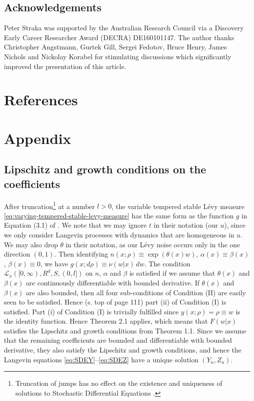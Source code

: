 \documentclass[a4paper,12pt]{elsarticle}
\numberwithin{equation}{section}
\theoremstyle{plain}
\theoremstyle{definition}
\theoremstyle{remark}
\numberwithin{equation}{section}
\newcommand{\1}{\mathbf 1}
\begin{document}
\subsection*{Acknowledgements}
Peter Straka was supported by the Australian Research Council via a 
Discovery Early Career Researcher Award (DECRA) DE160101147. 
The author thanks Christopher Angstmann, Gurtek Gill, 
Sergei Fedotov, Bruce Henry, James Nichols and Nickolay Korabel for stimulating discussions which 
significantly improved the presentation of this article. 

\section*{References}



\appendix

\section{Appendix}

\subsection{Lipschitz and growth conditions on the coefficients} 
\label{subsec:Lip-gro}
After truncation\footnote{Truncation of jumps has no effect on the existence and 
uniqueness of solutions to Stochastic Differential Equations \cite{Applebaum}.} 
at a number $l > 0$, the variable tempered stable L\'evy 
measure 
\eqref{eq:varying-tempered-stable-levy-measure}
has the same form as the function $g$ in Equation (3.1) of 
\cite{Tsuchiya1992}.  
We note that we may ignore $t$ in their notation (our $u$), since we only 
consider Langevin processes with dynamics that are homogeneous in $u$.
We may also drop $\theta$ in their notation, as our L\'evy noise occurs only 
in the one direction $(0,1)$. 
Then identifying $n(x;\rho) \equiv \exp(\theta(x) w)$, 
$\alpha(x) \equiv \beta(x)$, $\beta(x) \equiv 0$, 
we have $g(x;d\rho) \equiv \nu(w|x)\,dw$. 
The condition $\mathcal L_x([0,\infty), R^d, S, (0,l])$ on $n$, $\alpha$ and 
$\beta$ is satisfied if we assume that $\theta(x)$ and $\beta(x)$ are 
continuously differentiable with bounded derivative. 
If $\theta(x)$ and $\beta(x)$ are also bounded, then all four sub-conditions of 
Condition (II) are easily seen to be satisfied.  
Hence (s. top of page 111) part (ii) of Condition (I) is satisfied. 
Part (i) of Condition (I) is trivially fulfilled since 
$y(x; \rho) = \rho \equiv w$ is the identity function. 
Hence Theorem 2.1 applies, which means that $F(w|x)$ satisfies the Lipschitz 
and growth conditions from Theorem 1.1. 
Since we assume that the remaining coefficients are bounded and differentiable 
with bounded derivative, they also satisfy the Lipschitz and growth conditions, 
and hence the Langevin equations \eqref{eq:SDEY}--\eqref{eq:SDEZ} have a unique 
solution $(Y_u, Z_u)$.
\end{document}
